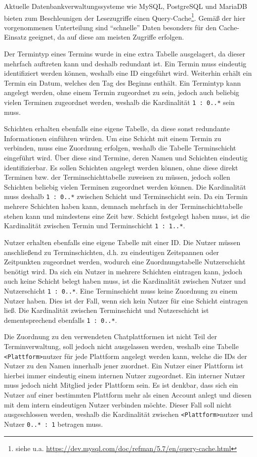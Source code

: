 Aktuelle Datenbankverwaltungssysteme wie MySQL, PostgreSQL und MariaDB bieten zum Beschleunigen der Lesezugriffe einen Query-Cache\footnote{siehe u.a. \url{https://dev.mysql.com/doc/refman/5.7/en/query-cache.html}}. Gemäß der hier vorgenommenen Unterteilung sind \enquote{schnelle} Daten besonders für den Cache-Einsatz geeignet, da auf diese am meisten Zugriffe erfolgen. 

Der Termintyp eines Termins wurde in eine extra Tabelle ausgelagert, da dieser mehrfach auftreten kann und deshalb redundant ist. Ein Termin muss eindeutig identifiziert werden können, weshalb eine ID eingeführt wird. Weiterhin erhält ein Termin ein Datum, welches den Tag des Beginns enthält. Ein Termintyp kann angelegt werden, ohne einem Termin zugeordnet zu sein, jedoch auch beliebig vielen Terminen zugeordnet werden, weshalb die Kardinalität \texttt{1 : 0..*} sein muss.

Schichten erhalten ebenfalls eine eigene Tabelle, da diese sonst redundante Informationen einführen würden. Um eine Schicht mit einem Termin zu verbinden, muss eine Zuordnung erfolgen, weshalb die Tabelle Terminschicht eingeführt wird. Über diese sind Termine, deren Namen und Schichten eindeutig identifizierbar. Es sollen Schichten angelegt werden können, ohne diese direkt Terminen bzw. der Terminschichttabelle zuweisen zu müssen, jedoch sollen Schichten beliebig vielen Terminen zugeordnet werden können. Die Kardinalität muss deshalb \texttt{1 : 0..*} zwischen Schicht und Terminschicht sein. Da ein Termin mehrere Schichten haben kann, demnach mehrfach in der Terminschichttabelle stehen kann und mindestens eine Zeit bzw. Schicht festgelegt haben muss, ist die Kardinalität zwischen Termin und Terminschicht \texttt{1 : 1..*}.

Nutzer erhalten ebenfalls eine eigene Tabelle mit einer ID. Die Nutzer müssen anschließend zu Terminschichten, d.h. zu eindeutigen Zeitspannen oder Zeitpunkten zugeordnet werden, wodurch eine Zuordnungstabelle Nutzerschicht benötigt wird. Da sich ein Nutzer in mehrere Schichten eintragen kann, jedoch auch keine Schicht belegt haben muss, ist die Kardinalität zwischen Nutzer und Nutzerschicht \texttt{1 : 0..*}. Eine Terminschicht muss keine Zuordnung zu einem Nutzer haben. Dies ist der Fall, wenn sich kein Nutzer für eine Schicht eintragen ließ. Die Kardinalität zwischen Terminschicht und Nutzerschicht ist dementsprechend ebenfalls \texttt{1 : 0..*}.

Die Zuordnung zu den verwendeten Chatplattformen ist nicht Teil der Terminverwaltung, soll jedoch nicht ausgelassen werden, weshalb eine Tabelle \texttt{<Plattform>}nutzer für jede Plattform angelegt werden kann, welche die IDs der Nutzer zu den Namen innerhalb jener zuordnet. Ein Nutzer einer Plattform ist hierbei immer eindeutig einem internen Nutzer zugeordnet. Ein interner Nutzer muss jedoch nicht Mitglied jeder Plattform sein. Es ist denkbar, dass sich ein Nutzer auf einer bestimmten Plattform mehr als einen Account anlegt und diesen mit dem intern eindeutigen Nutzer verbinden möchte. Dieser Fall soll nicht ausgeschlossen werden, weshalb die Kardinalität zwischen \texttt{<Plattform>}nutzer und Nutzer \texttt{0..* : 1} betragen muss.

